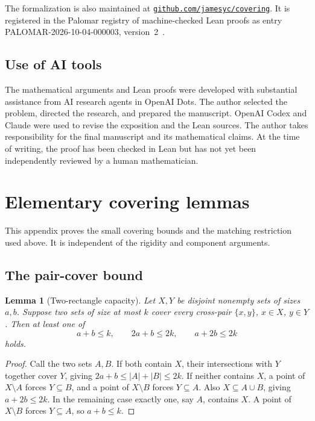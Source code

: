 \documentclass[11pt,letterpaper]{article}
\newtheorem{lemma}[theorem]{Lemma}
\theoremstyle{definition}\newtheorem{definition}[theorem]{Definition}
\theoremstyle{remark}\newtheorem{remark}[theorem]{Remark}
\begin{document}
The formalization is also maintained at \href{https://github.com/jamesyc/covering}{\nolinkurl{github.com/jamesyc/covering}}. It is registered in the Palomar registry of machine-checked Lean proofs as entry PALOMAR-2026-10-04-000003, version~2~\cite{Palomar}.

\subsection{Use of AI tools}
The mathematical arguments and Lean proofs were developed with substantial assistance from AI research agents in OpenAI Dots. The author selected the problem, directed the research, and prepared the manuscript. OpenAI Codex and Claude were used to revise the exposition and the Lean sources. The author takes responsibility for the final manuscript and its mathematical claims. At the time of writing, the proof has been checked in Lean but has not yet been independently reviewed by a human mathematician.

\appendix
\section{Elementary covering lemmas}\label{sec:small}
This appendix proves the small covering bounds and the matching restriction used above. It is independent of the rigidity and component arguments.

\subsection{The pair-cover bound}
\begin{lemma}[Two-rectangle capacity]\label{lem:rectangle}
Let $X,Y$ be disjoint nonempty sets of sizes $a,b$. Suppose two sets of size at most $k$ cover every cross-pair $\{x,y\}$, $x\in X$, $y\in Y$. Then at least one of
\[
 a+b\le k,\qquad 2a+b\le2k,\qquad a+2b\le2k
\]
holds.
\end{lemma}
\begin{proof}
Call the two sets $A,B$. If both contain $X$, their intersections with $Y$ together cover $Y$, giving $2a+b\le |A|+|B|\le2k$. If neither contains $X$, a point of $X\setminus A$ forces $Y\subseteq B$, and a point of $X\setminus B$ forces $Y\subseteq A$. Also $X\subseteq A\cup B$, giving $a+2b\le2k$. In the remaining case exactly one, say $A$, contains $X$. A point of $X\setminus B$ forces $Y\subseteq A$, so $a+b\le k$.
\end{proof}
\end{document}
